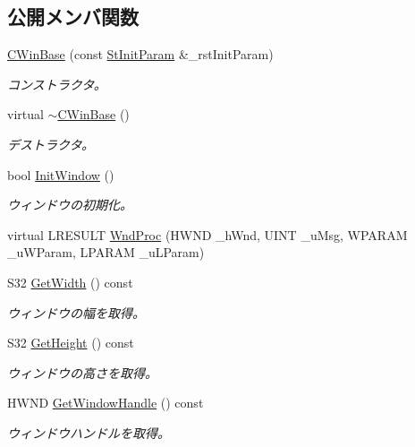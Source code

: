 \subsection*{公開メンバ関数}
\begin{DoxyCompactItemize}
\item 
\hyperlink{class_c_win_base_a61c9bced0a9d9cdcbbed44ad5d555a68}{C\+Win\+Base} (const \hyperlink{struct_c_win_base_1_1_st_init_param}{St\+Init\+Param} \&\+\_\+rst\+Init\+Param)
\begin{DoxyCompactList}\small\item\em コンストラクタ。 \end{DoxyCompactList}\item 
virtual \hyperlink{class_c_win_base_a7d8eda9e0a576178dc7c86967b6e9626}{$\sim$\+C\+Win\+Base} ()
\begin{DoxyCompactList}\small\item\em デストラクタ。 \end{DoxyCompactList}\item 
bool \hyperlink{class_c_win_base_ac9d42b98ac82db19bd562615fa9decd7}{Init\+Window} ()
\begin{DoxyCompactList}\small\item\em ウィンドウの初期化。 \end{DoxyCompactList}\item 
virtual L\+R\+E\+S\+U\+L\+T \hyperlink{class_c_win_base_a3c4c86f97de4eddaa300a73c952c84b2}{Wnd\+Proc} (H\+W\+N\+D \+\_\+h\+Wnd, U\+I\+N\+T \+\_\+u\+Msg, W\+P\+A\+R\+A\+M \+\_\+u\+W\+Param, L\+P\+A\+R\+A\+M \+\_\+u\+L\+Param)
\item 
S32 \hyperlink{class_c_win_base_a9f6a1a2c0b539863b6ad0fab052196dd}{Get\+Width} () const 
\begin{DoxyCompactList}\small\item\em ウィンドウの幅を取得。 \end{DoxyCompactList}\item 
S32 \hyperlink{class_c_win_base_ab283c793e272287f91e58e8ac9f31c63}{Get\+Height} () const 
\begin{DoxyCompactList}\small\item\em ウィンドウの高さを取得。 \end{DoxyCompactList}\item 
H\+W\+N\+D \hyperlink{class_c_win_base_afc7879c3e92a6a9a912191a0c318f25c}{Get\+Window\+Handle} () const 
\begin{DoxyCompactList}\small\item\em ウィンドウハンドルを取得。 \end{DoxyCompactList}\end{DoxyCompactItemize}
